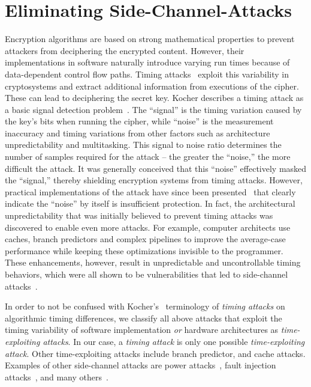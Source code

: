 
\section{Eliminating Side-Channel-Attacks}
\label{sec:app_side_channel_attack}

Encryption algorithms are based on strong mathematical properties to prevent attackers from deciphering the encrypted content. 
However, their implementations in software naturally introduce varying run times because of data-dependent control flow paths.
Timing attacks~\cite{Kocher96timingattacks} exploit this variability in cryptosystems and extract additional information  from executions of the cipher.
These can lead to deciphering the secret key.
Kocher describes a timing attack as a basic signal detection problem~\cite{Kocher96timingattacks}. 
The ``signal'' is the timing variation caused by the key's bits when running the cipher, while ``noise'' is the measurement inaccuracy and timing variations from other factors such as architecture unpredictability and multitasking. 
This signal to noise ratio determines the number of samples required for the attack -- the greater the ``noise,'' the more difficult the attack. 
It was generally conceived that this ``noise'' effectively masked the ``signal,'' thereby shielding encryption systems from timing attacks. 
However, practical implementations of the attack have since been presented~\cite{remoteattackspracticle,DKLMQW98,SCAsurvey} that clearly indicate the ``noise'' by itself is insufficient protection. 
In fact, the architectural unpredictability that was initially believed to prevent timing attacks was discovered to enable even more attacks.
For example, computer architects use caches, branch predictors and complex pipelines to improve the average-case performance while keeping these optimizations invisible to the programmer.
These enhancements, however, result in unpredictable and uncontrollable timing behaviors, which  were all shown to be vulnerabilities that led to side-channel attacks~\cite{2004-bernstein-cachetiming,Percival05cachemissing,Onur07predictingsecret,2009-x86timing}.

In order to not be confused with Kocher's~\cite{Kocher96timingattacks} terminology of \textit{timing attacks} on algorithmic timing differences, we classify all above attacks that exploit the timing variability of software implementation \textit{or} hardware architectures as \textit{time-exploiting attacks}. 
In our case, a \textit{timing attack} is only one possible \textit{time-exploiting attack}.
Other time-exploiting attacks include branch predictor, and cache attacks.
Examples of other side-channel attacks are power attacks~\cite{Messerges99investigationsof,Kocher99differentialpower}, fault injection attacks~\cite{biham97differential,Feng_efficientcomb}, and many others~\cite{SCAsurvey}.


